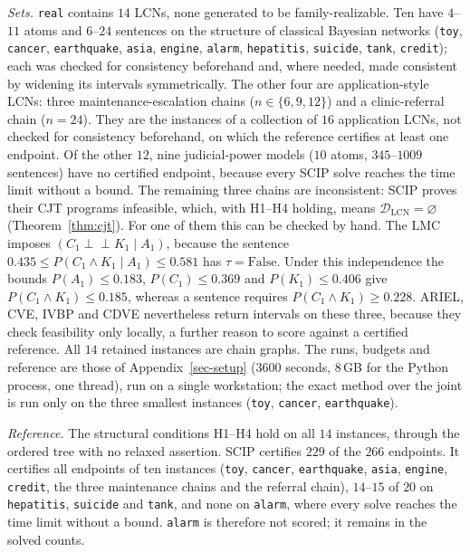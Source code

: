 \documentclass{article} %
\newenvironment{revblock}{\color{blue}}{}
\newcommand{\indep}{\perp\!\!\!\perp}
\newcommand{\DLCN}{\mathcal{D}_{\mathrm{LCN}}}
\begin{document}
\begin{revblock}
\emph{Sets.} \texttt{real} contains $14$ LCNs, none generated to be family-realizable. Ten have $4$--$11$ atoms and $6$--$24$ sentences on the structure of classical Bayesian networks (\texttt{toy}, \texttt{cancer}, \texttt{earthquake}, \texttt{asia}, \texttt{engine}, \texttt{alarm}, \texttt{hepatitis}, \texttt{suicide}, \texttt{tank}, \texttt{credit}); each was checked for consistency beforehand and, where needed, made consistent by widening its intervals symmetrically. The other four are application-style LCNs: three maintenance-escalation chains ($n\in\{6,9,12\}$) and a clinic-referral chain ($n=24$). They are the instances of a collection of $16$ application LCNs, not checked for consistency beforehand, on which the reference certifies at least one endpoint. Of the other $12$, nine judicial-power models ($10$ atoms, $345$--$1009$ sentences) have no certified endpoint, because every SCIP solve reaches the time limit without a bound. The remaining three chains are inconsistent: SCIP proves their CJT programs infeasible, which, with H1--H4 holding, means $\DLCN=\varnothing$ (Theorem~\ref{thm:cjt}). For one of them this can be checked by hand. The LMC imposes $(C_1\indep K_1\mid A_1)$, because the sentence $0.435\le P(C_1\wedge K_1\mid A_1)\le0.581$ has $\tau=\mathrm{False}$. Under this independence the bounds $P(A_1)\le0.183$, $P(C_1)\le0.369$ and $P(K_1)\le0.406$ give $P(C_1\wedge K_1)\le0.185$, whereas a sentence requires $P(C_1\wedge K_1)\ge0.228$. ARIEL, CVE, IVBP and CDVE nevertheless return intervals on these three, because they check feasibility only locally, a further reason to score against a certified reference. All $14$ retained instances are chain graphs. The runs, budgets and reference are those of Appendix~\ref{sec-setup} ($3600$ seconds, $8$\,GB for the Python process, one thread), run on a single workstation; the exact method over the joint is run only on the three smallest instances (\texttt{toy}, \texttt{cancer}, \texttt{earthquake}).

\emph{Reference.} The structural conditions H1--H4 hold on all $14$ instances, through the ordered tree with no relaxed assertion. SCIP certifies $229$ of the $266$ endpoints. It certifies all endpoints of ten instances (\texttt{toy}, \texttt{cancer}, \texttt{earthquake}, \texttt{asia}, \texttt{engine}, \texttt{credit}, the three maintenance chains and the referral chain), $14$--$15$ of $20$ on \texttt{hepatitis}, \texttt{suicide} and \texttt{tank}, and none on \texttt{alarm}, where every solve reaches the time limit without a bound. \texttt{alarm} is therefore not scored; it remains in the solved counts.


\end{revblock}
\end{document}
